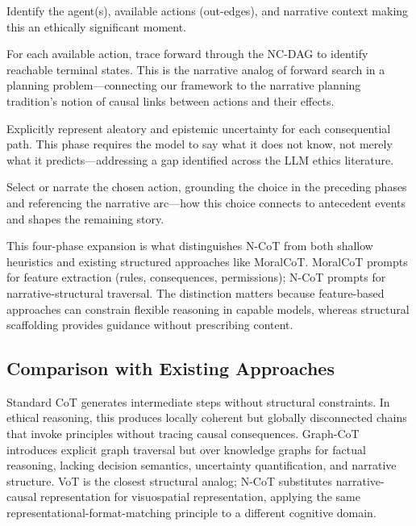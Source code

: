 \documentclass[11pt,letterpaper]{article}
\theoremstyle{defn}
\begin{document}
\begin{description}[leftmargin=2em,itemsep=0.4em]
\item[Phase 1 --- Situation Assessment.] Identify the agent(s), available actions (out-edges), and narrative context making this an ethically significant moment.
\item[Phase 2 --- Consequence Projection.] For each available action, trace forward through the NC-DAG to identify reachable terminal states. This is the narrative analog of forward search in a planning problem---connecting our framework to the narrative planning tradition's notion of causal links between actions and their effects.
\item[Phase 3 --- Uncertainty Articulation.] Explicitly represent aleatory and epistemic uncertainty for each consequential path. This phase requires the model to say what it does not know, not merely what it predicts---addressing a gap identified across the LLM ethics literature.
\item[Phase 4 --- Resolution and Commitment.] Select or narrate the chosen action, grounding the choice in the preceding phases and referencing the narrative arc---how this choice connects to antecedent events and shapes the remaining story.
\end{description}

This four-phase expansion is what distinguishes N-CoT from both shallow heuristics and existing structured approaches like MoralCoT. MoralCoT prompts for feature extraction (rules, consequences, permissions); N-CoT prompts for narrative-structural traversal. The distinction matters because feature-based approaches can constrain flexible reasoning in capable models, whereas structural scaffolding provides guidance without prescribing content.

\subsection{Comparison with Existing Approaches}

Standard CoT \citep{wei2022chain} generates intermediate steps without structural constraints. In ethical reasoning, this produces locally coherent but globally disconnected chains that invoke principles without tracing causal consequences. Graph-CoT \citep{jin2024graph} introduces explicit graph traversal but over knowledge graphs for factual reasoning, lacking decision semantics, uncertainty quantification, and narrative structure. VoT \citep{wu2024mindseye} is the closest structural analog; N-CoT substitutes narrative-causal representation for visuospatial representation, applying the same representational-format-matching principle to a different cognitive domain.
\end{document}
